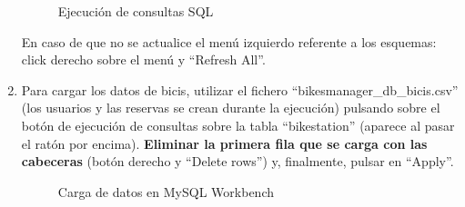 \begin{enumerate}
\begin{figure} [!htb]
		\caption{Ejecución de consultas SQL}
		\label{fig:mySQLWorkbench_2}
	\end{figure}
	\FloatBarrier
	 En caso de que no se actualice el menú izquierdo referente a los esquemas: click derecho sobre el menú y ``Refresh All''.
	\item Para cargar los datos de bicis, utilizar el fichero ``bikesmanager\_db\_bicis.csv'' (los usuarios y las reservas se crean durante la ejecución) pulsando sobre el botón de ejecución de consultas sobre la tabla ``bikestation'' (aparece al pasar el ratón por encima). \textbf{Eliminar la primera fila que se carga con las cabeceras} (botón derecho y ``Delete rows'') y, finalmente, pulsar en ``Apply''.
	\begin{figure} [!htb]
		\centering
		\caption{Carga de datos en MySQL Workbench}
		\label{fig:mySQLWorkbench_3}
	\end{figure}
	\FloatBarrier
\end{enumerate}

